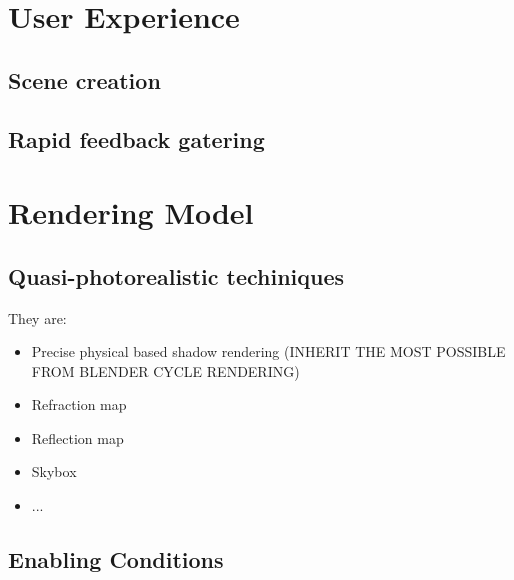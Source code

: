 \documentclass{sigchi}
\begin{document}








\section{User Experience} %
\label{sec:user_experience}

\subsection{Scene creation} %
\label{sub:scene_creation}


\subsection{Rapid feedback gatering} %
\label{sub:rapid_feedback}









\section{Rendering Model} %
\label{sec:rendering_model}


\subsection{Quasi-photorealistic techiniques}
\label{sub:quasi_photorealistic_techniques}

They are:

\begin{itemize}
  \item Precise physical based shadow rendering (INHERIT THE MOST POSSIBLE FROM BLENDER CYCLE RENDERING)
  \item Refraction map
  \item Reflection map
  \item Skybox
  \item ...
\end{itemize}





\subsection{Enabling Conditions} %
\label{sub:enabling_conditions}
\end{document}

